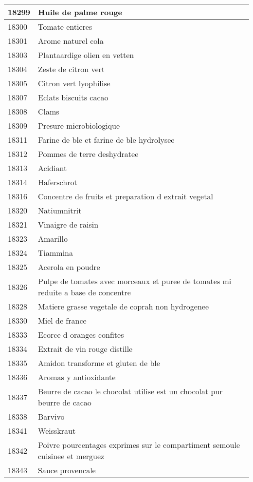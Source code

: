 \begin{longtable}{|l|l|}
18299 & Huile de palme rouge \\ \hline 
18300 & Tomate entieres \\ \hline 
18301 & Arome naturel cola \\ \hline 
18303 & Plantaardige olien en vetten \\ \hline 
18304 & Zeste de citron vert \\ \hline 
18305 & Citron vert lyophilise \\ \hline 
18307 & Eclats biscuits cacao \\ \hline 
18308 & Clams \\ \hline 
18309 & Presure microbiologique \\ \hline 
18311 & Farine de ble et farine de ble hydrolysee \\ \hline 
18312 & Pommes de terre deshydratee \\ \hline 
18313 & Acidiant \\ \hline 
18314 & Haferschrot \\ \hline 
18316 & Concentre de fruits et preparation d extrait vegetal \\ \hline 
18320 & Natiumnitrit \\ \hline 
18321 & Vinaigre de raisin \\ \hline 
18323 & Amarillo \\ \hline 
18324 & Tiammina \\ \hline 
18325 & Acerola en poudre \\ \hline 
18326 & Pulpe de tomates avec morceaux et puree de tomates mi reduite a base de concentre \\ \hline 
18328 & Matiere grasse vegetale de coprah non hydrogenee \\ \hline 
18330 & Miel de france \\ \hline 
18333 & Ecorce d oranges confites \\ \hline 
18334 & Extrait de vin rouge distille \\ \hline 
18335 & Amidon transforme et gluten de ble \\ \hline 
18336 & Aromas y antioxidante \\ \hline 
18337 & Beurre de cacao le chocolat utilise est un chocolat pur beurre de cacao \\ \hline 
18338 & Barvivo \\ \hline 
18341 & Weisskraut \\ \hline 
18342 & Poivre  pourcentages exprimes sur le compartiment semoule cuisinee et merguez \\ \hline 
18343 & Sauce provencale \\ \hline 

\end{longtable}
